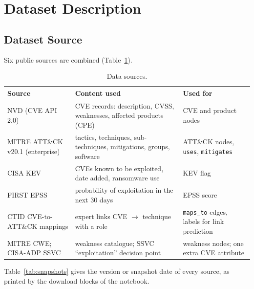 \documentclass[12pt, a4paper]{article}
\newcommand{\ATTCK}{ATT\&CK}
\begin{document}
\section{Dataset Description}
\subsection{Dataset Source}
Six public sources are combined (Table~\ref{tab:sources}).
\begin{table}[H]\centering\caption{Data sources.}\label{tab:sources}
\begin{tabularx}{\textwidth}{>{\raggedright\arraybackslash}p{3.3cm}>{\raggedright\arraybackslash}X>{\raggedright\arraybackslash}p{3.6cm}}
\toprule
\textbf{Source} & \textbf{Content used} & \textbf{Used for} \\ \midrule
NVD (CVE API 2.0) & CVE records: description, CVSS, weaknesses, affected products (CPE) & CVE and product nodes \\
MITRE \ATTCK{} v20.1 (enterprise) & tactics, techniques, sub-techniques, mitigations, groups, software & \ATTCK{} nodes, \texttt{uses}, \texttt{mitigates} \\
CISA KEV & CVEs known to be exploited, date added, ransomware use & KEV flag \\
FIRST EPSS & probability of exploitation in the next 30 days & EPSS score \\
CTID CVE-to-\ATTCK{} mappings & expert links CVE $\rightarrow$ technique with a role & \texttt{maps\_to} edges, labels for link prediction \\
MITRE CWE; CISA-ADP SSVC & weakness catalogue; SSVC ``exploitation'' decision point & weakness nodes; one extra CVE attribute \\
\bottomrule
\end{tabularx}
\end{table}
Table~\ref{tab:snapshots} gives the version or snapshot date of every source, as printed by the download blocks of the notebook.
\end{document}
